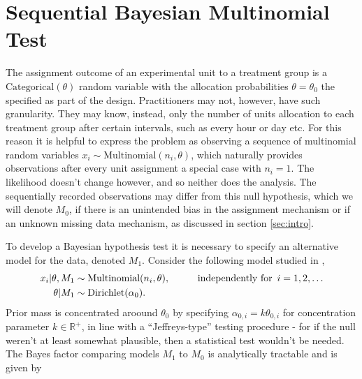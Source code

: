 \documentclass[11pt]{article}
\begin{document}

\section{Sequential Bayesian Multinomial Test}
\label{sec:srm_testing}
The assignment outcome of an experimental unit to a treatment group is a $\text{Categorical}(\theta)$ random variable with the allocation probabilities $\theta=\theta_0$ the specified as part of the design. Practitioners may not, however, have such granularity. They may know, instead, only the number of units allocation to each treatment group after certain intervals, such as every hour or day etc. For this reason it is helpful to express the problem as observing a sequence of multinomial random variables $x_i \sim \text{Multinomial}(n_i, \theta)$, which naturally provides observations after every unit assignment a special case with $n_i = 1$. The likelihood doesn't change however, and so neither does the analysis.
The sequentially recorded observations may differ from this null hypothesis, which we will denote $M_0$, if there is an unintended bias in the assignment mechanism or if an unknown missing data mechanism, as discussed in section \ref{sec:intro}.

To develop a Bayesian hypothesis test it is necessary to specify an alternative model for the data, denoted $M_1$. Consider the following model studied in \cite{good},
\begin{align}
    x_i | \theta, M_1 &\sim \text{Multinomial}(n_i,\theta), \hspace{1cm} \text{independently for }\, i=1,2,\dots\\
  \theta | M_1 &\sim \text{Dirichlet}(\alpha_0).\notag
\end{align}
Prior mass is concentrated aroound $\theta_0$ by specifying $\alpha_{0,i} = k \theta_{0,i}$ for concentration parameter $k \in \mathbb{R}^+$, in line with a ``Jeffreys-type'' testing procedure - for if the null weren't at least somewhat plausible, then a statistical test wouldn't be needed. The Bayes factor comparing models $M_1$ to $M_0$ is analytically tractable and is given by
\end{document}
